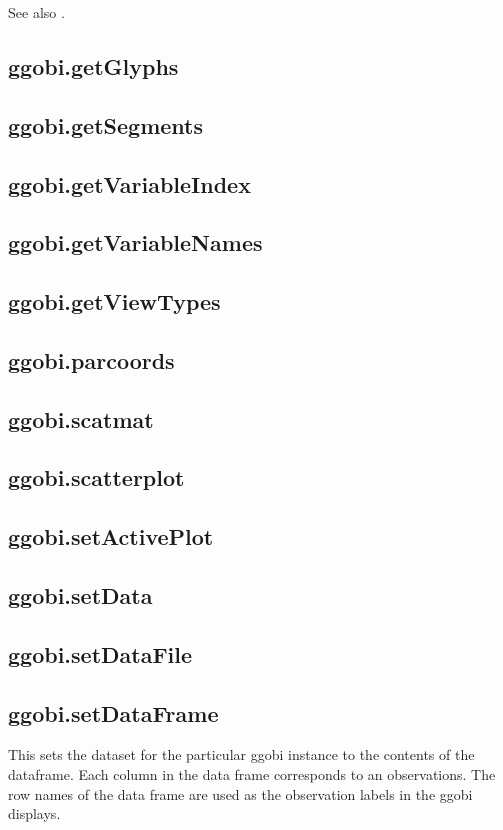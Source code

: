 \documentclass{article}
\begin{document}
See also .

\subsection{ggobi.getGlyphs}
\subsection{ggobi.getSegments}
\subsection{ggobi.getVariableIndex}
\subsection{ggobi.getVariableNames}
\subsection{ggobi.getViewTypes}
\subsection{ggobi.parcoords}
\subsection{ggobi.scatmat}
\subsection{ggobi.scatterplot}
\subsection{ggobi.setActivePlot}
\subsection{ggobi.setData}
\subsection{ggobi.setDataFile}
\subsection{ggobi.setDataFrame}
This sets the dataset for the particular ggobi instance to the
contents of the dataframe.  Each column in the data frame corresponds
to an observations. The row names of the data frame are used as the
observation labels in the ggobi displays.
\end{document}
